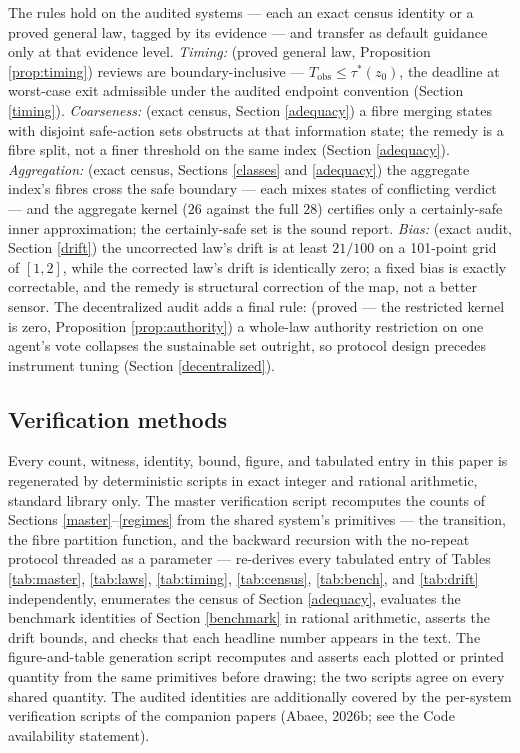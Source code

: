 \documentclass[10pt,twocolumn]{article}
\theoremstyle{definition}
\begin{document}
The rules hold on the audited systems --- each an exact census identity or a proved general law, tagged by its evidence --- and transfer as default guidance only at that evidence level. \emph{Timing:} (proved general law, Proposition \ref{prop:timing}) reviews are boundary-inclusive ---
\(T_{\mathrm{obs}} \le \tau^{*}(z_0)\), the deadline at worst-case exit admissible under the audited endpoint convention (Section \ref{timing}). \emph{Coarseness:} (exact census, Section \ref{adequacy}) a fibre
merging states with disjoint safe-action sets obstructs at that
information state; the remedy is a fibre split, not a finer threshold
on the same index (Section \ref{adequacy}). \emph{Aggregation:} (exact census, Sections \ref{classes} and \ref{adequacy}) the aggregate index's fibres cross the safe boundary --- each mixes states of conflicting verdict --- and the aggregate kernel (\(26\) against the full \(28\)) certifies only a certainly-safe inner approximation; the certainly-safe set is the sound report.
\emph{Bias:} (exact audit, Section \ref{drift}) the uncorrected law's drift is at least \(21/100\) on a
101-point grid of \([1,2]\), while the corrected law's drift is
identically zero; a fixed bias is exactly correctable, and the remedy is
structural correction of the map, not a better sensor. The decentralized audit adds a final rule: (proved --- the restricted kernel is zero, Proposition \ref{prop:authority}) a whole-law authority restriction on one agent's vote collapses the sustainable set outright, so protocol
design precedes instrument tuning (Section \ref{decentralized}).

\subsection{Verification methods}\label{methods}

Every count, witness, identity, bound, figure, and tabulated entry in
this paper is regenerated by deterministic scripts in exact integer and
rational arithmetic, standard library only. The master verification
script recomputes the counts of Sections \ref{master}--\ref{regimes}
from the shared system's primitives --- the transition, the fibre
partition function, and the backward recursion with the no-repeat
protocol threaded as a parameter --- re-derives every tabulated entry of
Tables \ref{tab:master}, \ref{tab:laws}, \ref{tab:timing},
\ref{tab:census}, \ref{tab:bench}, and \ref{tab:drift} independently,
enumerates the census of Section \ref{adequacy}, evaluates the
benchmark identities of Section \ref{benchmark} in rational
arithmetic, asserts the drift bounds, and checks that each headline
number appears in the text. The figure-and-table generation script
recomputes and asserts each plotted or printed quantity from the same
primitives before drawing; the two scripts agree on every shared
quantity. The audited identities are additionally covered by the
per-system verification scripts of the companion papers (Abaee, 2026b;
see the Code availability statement).
\end{document}
